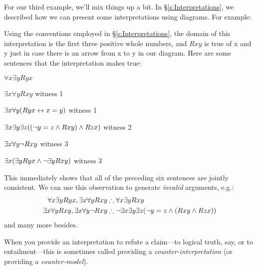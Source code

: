 For our third example, we'll mix things up a bit. In \S\ref{s:Interpretations}, we described how we can present some interpretations using diagrams. For example:
\begin{center}
\end{center}
Using the conventions employed in \S\ref{s:Interpretations}, the domain of this interpretation is the first three positive whole numbers, and $Rxy$ is true of x and y just in case there is an arrow from x to y in our diagram. Here are some sentences that the interpretation makes true:
	\begin{ebullet}
		\item $\forall x \exists y Ryx$
		\item $\exists x \forall y Rxy$ \hfill witness 1
		\item $\exists x \forall y (Ryx \leftrightarrow x = y)$ \hfill witness 1
		\item $\exists x \exists y \exists z ((\neg y = z \mathbin{\wedge} Rxy) \mathbin{\wedge} Rzx)$ \hfill witness 2
		\item $\exists x \forall y \neg Rxy$ \hfill witness 3
		\item $\exists x (\exists y Ryx \mathbin{\wedge} \neg \exists y Rxy)$ \hfill witness 3
	\end{ebullet}
This immediately shows that all of the preceding six sentences are jointly consistent. We can use this observation to generate \emph{invalid} arguments, e.g.:
	\begin{align*}
		\forall x \exists y Ryx, \exists x \forall y Rxy  &\therefore  \forall x \exists y Rxy\\
		\exists x \forall y Rxy, \exists x \forall y \enot Rxy & \therefore \enot \exists x \exists y \exists z (\enot y = z \eand (Rxy \eand Rzx))
	\end{align*}
and many more besides.

When you provide an interpretation to refute a claim---to logical truth, say, or to entailment---this is sometimes called providing a \emph{counter-interpretation} (or providing a \emph{counter-model}).

